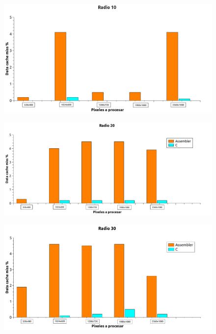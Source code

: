 \begin{figure}[H]
\begin{center}
  \includegraphics[width=\linewidth]{cache/Radio10.png}
\end{center}
\end{figure}

\begin{figure}[H]
\begin{center}
  \includegraphics[width=\linewidth]{cache/Radio20.pdf} 
\end{center}
\end{figure}

\begin{figure}[H]
\begin{center}
  \includegraphics[width=\linewidth]{cache/Radio30.pdf}
\end{center}
\end{figure}


